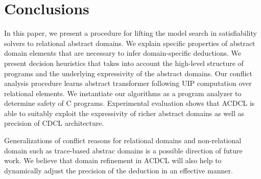 \section{Conclusions}
In this paper, we present a procedure for lifting the model search 
in satisfiability solvers to relational abstract domains.  We explain 
specific properties of abstract domain elements that are necessary to infer 
domain-specific deductions.  We present decision heuristics that takes 
into account the high-level structure of programs and the underlying 
expressivity of the abstract domains.  Our conflict analysis procedure 
learns abstract transformer following UIP computation over relational 
elements.  We instantiate our algorithms as a program analyzer to determine
safety of C programs.  Experimental evaluation shows that ACDCL is able 
to suitably exploit the expressivity of richer abstract domains as well 
as precision of CDCL architecture.

Generalizations of conflict reasons for relational domains 
and non-relational domain such as trace-based abstrac domains is a 
possible direction of future work.  We believe that domain refinement 
in ACDCL will also help to dynamically adjust the precision of the 
deduction in an effective manner. 


